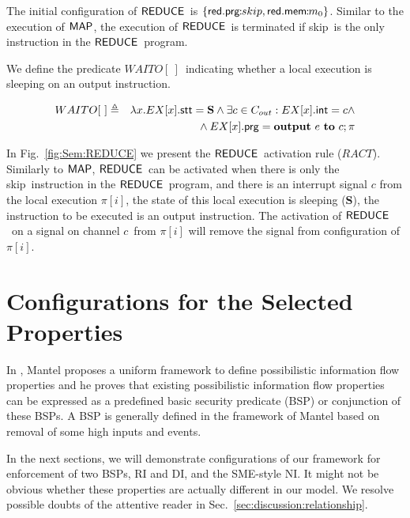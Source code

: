 \documentclass[10pt,a4paper,oneside]{article}
\def\intsig#1{\ensuremath{#1}}
\def\sS{\textbf{S}}
\def\ST{{\ensuremath{EX}}}
\def\chnl{\ensuremath{c}}
\def\Cout{\ensuremath{C_{out}}}
\def\lcomma{\ensuremath{\!\!:\!\!}}
\def\sanserif#1{\ensuremath{\sf #1}}
\def\REDUCE{\ensuremath{\sanserif{REDUCE}}}
\def\MAP{\ensuremath{\sanserif{MAP}}}
\def\Prog{\ensuremath{\pi}}
\def\Progl#1{\ensuremath{\Prog[#1]}}
\def\comm{\ensuremath{\pi}}
\def\RREDUCEINIT{RACT}
\def\NSKIP{skip}
\def\ioutput#1#2{\textbf{output} ~\ensuremath{#1}~ \textbf{to}~ \ensuremath{#2}}
\def\NINIREDUCE{\ensuremath{WAITO}}
\def\emptyPlace{\ensuremath{[\ ]}}
\def\INIREDUCED{\ensuremath{\NINIREDUCE\emptyPlace}}
\def\lprog{{\sf prg}}
\def\lprogr{{\sf prg}}
\def\lmem{{\sf mem}}
\def\litr{{\sf int}}
\def\lreduce{{\sf red}}
\def\lstate{{\sf stt}}
\begin{document}
The initial configuration of \REDUCE\ is $\{\lreduce.\lprogr\lcomma\NSKIP, \lreduce.\lmem\lcomma m_0 \}$. Similar to the execution of \MAP, the execution of \REDUCE\ is terminated if \NSKIP\ is the only instruction in the \REDUCE\ program.




We define the predicate \INIREDUCED\ indicating whether a local execution is sleeping on an output instruction.


\begin{eqnarray*}
\INIREDUCED & \triangleq & \lambda x. \ST[x].\lstate = \sS \wedge \exists \chnl \in \Cout:\ST[x].\litr = \intsig{\chnl} \wedge \nonumber \\
			& & {} \wedge \ST[x].\lprog = \ioutput{e}{\chnl};\comm
\end{eqnarray*}


In Fig.~\ref{fig:Sem:REDUCE} we present the \REDUCE\ activation rule ($\RREDUCEINIT$).  Similarly to \MAP, \REDUCE\ can be activated when there is only the \NSKIP\ instruction in the \REDUCE\ program, and there is an interrupt signal  \intsig{\chnl} from the local execution \Progl{i}, the state of this local execution is sleeping (\sS), the instruction to be executed is an output instruction. The activation of  \REDUCE\ on a signal on channel \chnl\ from \Progl{i} will remove the signal from configuration of \Progl{i}.

\section{Configurations for the Selected Properties}\label{sec:em}

In \cite{MANT-00-CSF}, Mantel proposes a uniform framework to define possibilistic information flow properties and he proves that existing possibilistic information flow properties can be expressed as a predefined basic security predicate (BSP) or conjunction of these BSPs. A BSP is generally defined in the framework of Mantel based on removal of some high inputs and events.





In the next sections, we will demonstrate configurations of our framework for enforcement of two BSPs, RI and DI, and the SME-style NI. It might not be obvious whether these properties are actually different in our model. We resolve possible doubts of the attentive reader in Sec.~\ref{sec:discussion:relationship}.
\end{document}
